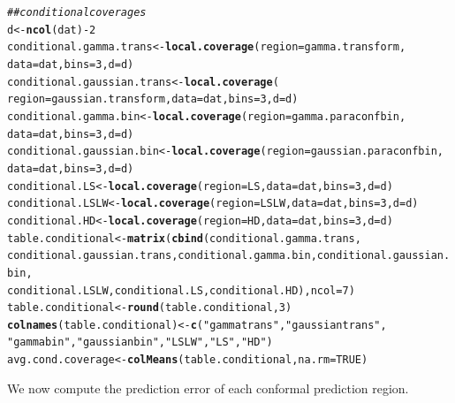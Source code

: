 \documentclass[11pt]{article}\usepackage[]{graphicx}\usepackage[]{color}
\makeatletter
\newcommand{\hlnum}[1]{\textcolor[rgb]{0.686,0.059,0.569}{#1}}%
\newcommand{\hlstr}[1]{\textcolor[rgb]{0.192,0.494,0.8}{#1}}%
\newcommand{\hlcom}[1]{\textcolor[rgb]{0.678,0.584,0.686}{\textit{#1}}}%
\newcommand{\hlopt}[1]{\textcolor[rgb]{0,0,0}{#1}}%
\newcommand{\hlstd}[1]{\textcolor[rgb]{0.345,0.345,0.345}{#1}}%
\newcommand{\hlkwb}[1]{\textcolor[rgb]{0.69,0.353,0.396}{#1}}%
\newcommand{\hlkwc}[1]{\textcolor[rgb]{0.333,0.667,0.333}{#1}}%
\newcommand{\hlkwd}[1]{\textcolor[rgb]{0.737,0.353,0.396}{\textbf{#1}}}%
\newenvironment{kframe}{%
 \def\at@end@of@kframe{}%
 \ifinner\ifhmode%
  \def\at@end@of@kframe{\end{minipage}}%
  \begin{minipage}{\columnwidth}%
 \fi\fi%
 \def\FrameCommand##1{\hskip\@totalleftmargin \hskip-\fboxsep
 \colorbox{shadecolor}{##1}\hskip-\fboxsep
     \hskip-\linewidth \hskip-\@totalleftmargin \hskip\columnwidth}%
 \MakeFramed {\advance\hsize-\width
   \@totalleftmargin\z@ \linewidth\hsize
   \@setminipage}}%
 {\par\unskip\endMakeFramed%
 \at@end@of@kframe}
\newenvironment{knitrout}{}{} %
\makeatother
\begin{document}
\begin{knitrout}
\begin{kframe}
\begin{alltt}
\hlcom{## conditional coverages}
\hlstd{d} \hlkwb{<-} \hlkwd{ncol}\hlstd{(dat)} \hlopt{-} \hlnum{2}
\hlstd{conditional.gamma.trans} \hlkwb{<-} \hlkwd{local.coverage}\hlstd{(}\hlkwc{region} \hlstd{= gamma.transform,}
  \hlkwc{data} \hlstd{= dat,} \hlkwc{bins} \hlstd{=} \hlnum{3}\hlstd{,} \hlkwc{d} \hlstd{= d)}
\hlstd{conditional.gaussian.trans} \hlkwb{<-} \hlkwd{local.coverage}\hlstd{(}
  \hlkwc{region} \hlstd{= gaussian.transform,} \hlkwc{data} \hlstd{= dat,} \hlkwc{bins} \hlstd{=} \hlnum{3}\hlstd{,} \hlkwc{d} \hlstd{= d)}
\hlstd{conditional.gamma.bin} \hlkwb{<-} \hlkwd{local.coverage}\hlstd{(}\hlkwc{region} \hlstd{= gamma.paraconfbin,}
  \hlkwc{data} \hlstd{= dat,} \hlkwc{bins} \hlstd{=} \hlnum{3}\hlstd{,} \hlkwc{d} \hlstd{= d)}
\hlstd{conditional.gaussian.bin} \hlkwb{<-} \hlkwd{local.coverage}\hlstd{(}\hlkwc{region} \hlstd{= gaussian.paraconfbin,}
  \hlkwc{data} \hlstd{= dat,} \hlkwc{bins} \hlstd{=} \hlnum{3}\hlstd{,} \hlkwc{d} \hlstd{= d)}
\hlstd{conditional.LS} \hlkwb{<-} \hlkwd{local.coverage}\hlstd{(}\hlkwc{region} \hlstd{= LS,} \hlkwc{data} \hlstd{= dat,} \hlkwc{bins} \hlstd{=} \hlnum{3}\hlstd{,} \hlkwc{d} \hlstd{= d)}
\hlstd{conditional.LSLW} \hlkwb{<-} \hlkwd{local.coverage}\hlstd{(}\hlkwc{region} \hlstd{= LSLW,} \hlkwc{data} \hlstd{= dat,} \hlkwc{bins} \hlstd{=} \hlnum{3}\hlstd{,} \hlkwc{d} \hlstd{= d)}
\hlstd{conditional.HD} \hlkwb{<-} \hlkwd{local.coverage}\hlstd{(}\hlkwc{region} \hlstd{= HD,} \hlkwc{data} \hlstd{= dat,} \hlkwc{bins} \hlstd{=} \hlnum{3}\hlstd{,} \hlkwc{d} \hlstd{= d)}
\hlstd{table.conditional} \hlkwb{<-} \hlkwd{matrix}\hlstd{(}\hlkwd{cbind}\hlstd{(conditional.gamma.trans,}
  \hlstd{conditional.gaussian.trans, conditional.gamma.bin, conditional.gaussian.bin,}
  \hlstd{conditional.LSLW, conditional.LS, conditional.HD),} \hlkwc{ncol} \hlstd{=} \hlnum{7}\hlstd{)}
\hlstd{table.conditional} \hlkwb{<-} \hlkwd{round}\hlstd{(table.conditional,} \hlnum{3}\hlstd{)}
\hlkwd{colnames}\hlstd{(table.conditional)} \hlkwb{<-} \hlkwd{c}\hlstd{(}\hlstr{"gamma trans"}\hlstd{,} \hlstr{"gaussian trans"}\hlstd{,}
  \hlstr{"gamma bin"}\hlstd{,} \hlstr{"gaussian bin"}\hlstd{,} \hlstr{"LSLW"}\hlstd{,} \hlstr{"LS"}\hlstd{,} \hlstr{"HD"}\hlstd{)}
\hlstd{avg.cond.coverage} \hlkwb{<-} \hlkwd{colMeans}\hlstd{(table.conditional,}\hlkwc{na.rm} \hlstd{=} \hlnum{TRUE}\hlstd{)}
\end{alltt}
\end{kframe}
\end{knitrout}


We now compute the prediction error of each conformal prediction region.
\end{document}
